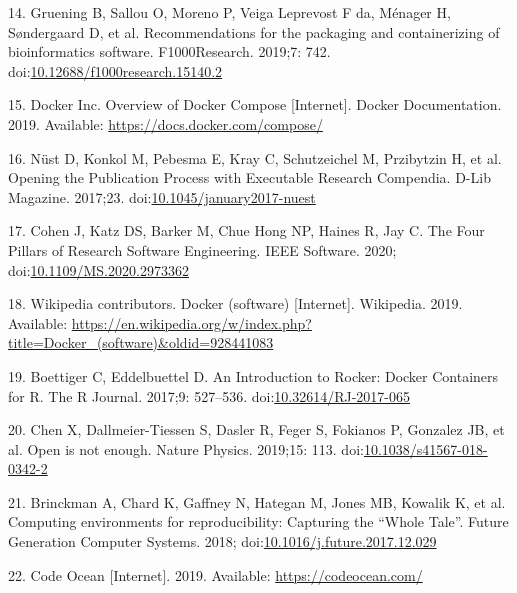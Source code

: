 \documentclass[10pt,letterpaper]{article}
\begin{document}
\leavevmode\hypertarget{ref-gruening_recommendations_2019}{}%
14. Gruening B, Sallou O, Moreno P, Veiga Leprevost F da, Ménager H,
Søndergaard D, et al. Recommendations for the packaging and
containerizing of bioinformatics software. F1000Research. 2019;7: 742.
doi:\href{https://doi.org/10.12688/f1000research.15140.2}{10.12688/f1000research.15140.2}

\leavevmode\hypertarget{ref-docker-compose_2019}{}%
15. Docker Inc. Overview of Docker Compose {[}Internet{]}. Docker
Documentation. 2019. Available: \url{https://docs.docker.com/compose/}

\leavevmode\hypertarget{ref-nust_opening_2017}{}%
16. Nüst D, Konkol M, Pebesma E, Kray C, Schutzeichel M, Przibytzin H,
et al. Opening the Publication Process with Executable Research
Compendia. D-Lib Magazine. 2017;23.
doi:\href{https://doi.org/10.1045/january2017-nuest}{10.1045/january2017-nuest}

\leavevmode\hypertarget{ref-cohen_four_2020}{}%
17. Cohen J, Katz DS, Barker M, Chue Hong NP, Haines R, Jay C. The Four
Pillars of Research Software Engineering. IEEE Software. 2020;
doi:\href{https://doi.org/10.1109/MS.2020.2973362}{10.1109/MS.2020.2973362}

\leavevmode\hypertarget{ref-wikipedia_contributors_docker_2019}{}%
18. Wikipedia contributors. Docker (software) {[}Internet{]}. Wikipedia.
2019. Available:
\url{https://en.wikipedia.org/w/index.php?title=Docker_(software)\&oldid=928441083}

\leavevmode\hypertarget{ref-boettiger_introduction_2017}{}%
19. Boettiger C, Eddelbuettel D. An Introduction to Rocker: Docker
Containers for R. The R Journal. 2017;9: 527--536.
doi:\href{https://doi.org/10.32614/RJ-2017-065}{10.32614/RJ-2017-065}

\leavevmode\hypertarget{ref-chen_open_2019}{}%
20. Chen X, Dallmeier-Tiessen S, Dasler R, Feger S, Fokianos P, Gonzalez
JB, et al. Open is not enough. Nature Physics. 2019;15: 113.
doi:\href{https://doi.org/10.1038/s41567-018-0342-2}{10.1038/s41567-018-0342-2}

\leavevmode\hypertarget{ref-brinckman_computing_2018}{}%
21. Brinckman A, Chard K, Gaffney N, Hategan M, Jones MB, Kowalik K, et
al. Computing environments for reproducibility: Capturing the ``Whole
Tale''. Future Generation Computer Systems. 2018;
doi:\href{https://doi.org/10.1016/j.future.2017.12.029}{10.1016/j.future.2017.12.029}

\leavevmode\hypertarget{ref-code_ocean_2019}{}%
22. Code Ocean {[}Internet{]}. 2019. Available:
\url{https://codeocean.com/}
\end{document}
